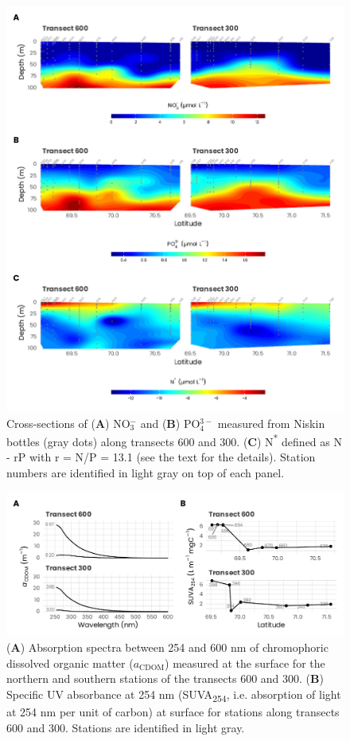 \documentclass[essd, manuscript]{copernicus}
\begin{document}
\begin{figure}[H]
    \centering
    \includegraphics[scale = 0.85]{../../../graphs/fig06.pdf}
    \caption{Cross-sections of (\textbf{A}) NO$_3^-$ and (\textbf{B}) PO$_4^{3-}$ measured from Niskin bottles (gray dots) along transects 600 and 300. (\textbf{C}) N\textsuperscript{*} defined as N - rP with r = N/P = 13.1 (see the text for the details). Station numbers are identified in light gray on top of each panel.}
\end{figure}

\clearpage

\begin{figure}[H]
    \centering
    \includegraphics[scale = 1]{../../../graphs/fig07.pdf}
    \caption{(\textbf{A}) Absorption spectra between 254 and 600 nm of chromophoric dissolved organic matter ($a_{\text{CDOM}}$) measured at the surface for the northern and southern stations of the transects 600 and 300. (\textbf{B}) Specific UV absorbance at 254 nm (SUVA\textsubscript{254}, i.e. absorption of light at 254 nm per unit of carbon) at surface for stations along transects 600 and 300. Stations are identified in light gray.}
\end{figure}
\end{document}
